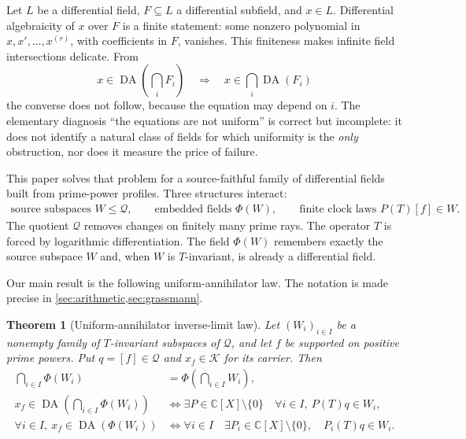 \documentclass[11pt]{article}
\newtheorem{theorem}{Theorem}[section]
\theoremstyle{definition}
\theoremstyle{remark}
\newcommand{\C}{\mathbb C}
\newcommand{\K}{\mathcal K}
\newcommand{\Q}{\mathcal Q}
\newcommand{\DA}{\operatorname{DA}}
\begin{document}
Let $L$ be a differential field, $F\subseteq L$ a differential subfield, and $x\in L$.
Differential algebraicity of $x$ over $F$ is a finite statement: some nonzero polynomial in
$x,x',\ldots,x^{(r)}$, with coefficients in $F$, vanishes.  This finiteness makes infinite field
intersections delicate.  From
\[
  x\in\DA\!\left(\bigcap_i F_i\right)
  \quad\Longrightarrow\quad
  x\in\bigcap_i\DA(F_i)
\tag{1.1}
\]
the converse does not follow, because the equation may depend on $i$.  The elementary diagnosis
``the equations are not uniform'' is correct but incomplete: it does not identify a natural class
of fields for which uniformity is the \emph{only} obstruction, nor does it measure the price of
failure.

This paper solves that problem for a source-faithful family of differential fields built from
prime-power profiles.  Three structures interact:
\[
  \boxed{
  \begin{gathered}
  \text{source subspaces }W\leq\Q,
  \qquad \text{embedded fields }\Phi(W),
  \qquad \text{finite clock laws }P(T)[f]\in W.\tag{1.2}
  \end{gathered}}
\]
The quotient $\Q$ removes changes on finitely many prime rays.  The operator $T$ is forced by
logarithmic differentiation.  The field $\Phi(W)$ remembers exactly the source subspace $W$ and,
when $W$ is $T$-invariant, is already a differential field.

Our main result is the following uniform-annihilator law.  The notation is made precise in
\cref{sec:arithmetic,sec:grassmann}.

\begin{theorem}[Uniform-annihilator inverse-limit law]\label{thm:master-intro}
Let $(W_i)_{i\in I}$ be a nonempty family of $T$-invariant subspaces of $\Q$, and let $f$ be
supported on positive prime powers.  Put $q=[f]\in\Q$ and $x_f\in\K$ for its carrier.  Then
\begin{align}
  \bigcap_{i\in I}\Phi(W_i)
    &=\Phi\!\left(\bigcap_{i\in I}W_i\right), \tag{1.3}\\
  x_f\in\DA\!\left(\bigcap_{i\in I}\Phi(W_i)\right)
    &\Longleftrightarrow
      \exists P\in\C[X]\setminus\{0\}\quad
        \forall i\in I,\ P(T)q\in W_i, \tag{1.4}\\
  \forall i\in I,\ x_f\in\DA(\Phi(W_i))
    &\Longleftrightarrow
      \forall i\in I\quad\exists P_i\in\C[X]\setminus\{0\},\quad
        P_i(T)q\in W_i. \tag{1.5}
\end{align}
\end{theorem}
\end{document}
